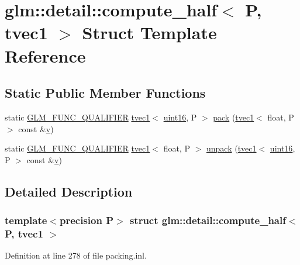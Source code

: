 \hypertarget{structglm_1_1detail_1_1compute__half_3_01_p_00_01tvec1_01_4}{}\section{glm\+::detail\+::compute\+\_\+half$<$ P, tvec1 $>$ Struct Template Reference}
\label{structglm_1_1detail_1_1compute__half_3_01_p_00_01tvec1_01_4}
\subsection*{Static Public Member Functions}
\begin{DoxyCompactItemize}
\item 
static \mbox{\hyperlink{setup_8hpp_a33fdea6f91c5f834105f7415e2a64407}{G\+L\+M\+\_\+\+F\+U\+N\+C\+\_\+\+Q\+U\+A\+L\+I\+F\+I\+ER}} \mbox{\hyperlink{structglm_1_1tvec1}{tvec1}}$<$ \mbox{\hyperlink{namespaceglm_1_1detail_a47b2a7d006d187338e8031a352d1ce56}{uint16}}, P $>$ \mbox{\hyperlink{structglm_1_1detail_1_1compute__half_3_01_p_00_01tvec1_01_4_a9a68b199364fc66de210ca1de0d2242b}{pack}} (\mbox{\hyperlink{structglm_1_1tvec1}{tvec1}}$<$ float, P $>$ const \&\mbox{\hyperlink{glad_8h_a14cfbe2fc2234f5504618905b69d1e06}{v}})
\item 
static \mbox{\hyperlink{setup_8hpp_a33fdea6f91c5f834105f7415e2a64407}{G\+L\+M\+\_\+\+F\+U\+N\+C\+\_\+\+Q\+U\+A\+L\+I\+F\+I\+ER}} \mbox{\hyperlink{structglm_1_1tvec1}{tvec1}}$<$ float, P $>$ \mbox{\hyperlink{structglm_1_1detail_1_1compute__half_3_01_p_00_01tvec1_01_4_a92e6b667d1d28ae167b9df692c805afd}{unpack}} (\mbox{\hyperlink{structglm_1_1tvec1}{tvec1}}$<$ \mbox{\hyperlink{namespaceglm_1_1detail_a47b2a7d006d187338e8031a352d1ce56}{uint16}}, P $>$ const \&\mbox{\hyperlink{glad_8h_a14cfbe2fc2234f5504618905b69d1e06}{v}})
\end{DoxyCompactItemize}


\subsection{Detailed Description}
\subsubsection*{template$<$precision P$>$\newline
struct glm\+::detail\+::compute\+\_\+half$<$ P, tvec1 $>$}



Definition at line 278 of file packing.\+inl.



